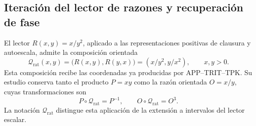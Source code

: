 \subsection{Iteración del lector de razones y recuperación de fase}
\label{corpus9:iv:q}

El lector \(R(x,y)=x/y^2\), aplicado a las representaciones positivas
de clausura y autoescala, admite la composición orientada
\[
 \mathcal Q_{\mathrm{rat}}(x,y)
   =\bigl(R(x,y),R(y,x)\bigr)
   =(x/y^2,y/x^2),\qquad x,y>0.
\]
Esta composición recibe las coordenadas ya producidas por
APP--TRIT--TPK. Su estudio conserva tanto el producto \(P=xy\)
como la razón orientada \(O=x/y\), cuyas transformaciones son
\[
 P\circ\mathcal Q_{\mathrm{rat}}=P^{-1},\qquad
 O\circ\mathcal Q_{\mathrm{rat}}=O^3.
\]
La notación \(\mathcal Q_{\mathrm{rat}}\) distingue esta aplicación
de la extensión a intervalos del lector escalar.

